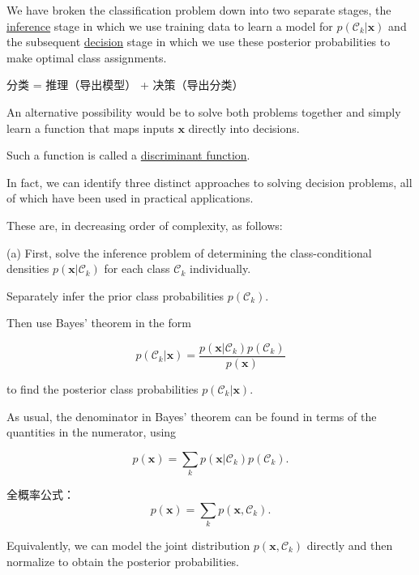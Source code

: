 \documentclass{article}
\begin{document}
We have broken the classification problem down into two separate stages, the \underline{\color{red}inference} stage in which we use training data to learn a model for $p(\mathcal{C}_{k}|\mathbf{x})$ and the subsequent \underline{\color{red}decision} stage in which we use these posterior probabilities to make optimal class assignments. 

{\color{red}
分类 = 推理（导出模型） + 决策（导出分类）
}

An alternative possibility would be to solve both problems together and simply learn a function that maps inputs $\mathbf{x}$ directly into decisions. 

Such a function is called a \underline{\color{red}discriminant function}.

In fact, we can identify three distinct approaches to solving decision problems, all of which have been used in practical applications. 

These are, in decreasing order of complexity, as follows:

(a) First, solve the inference problem of determining the class-conditional densities $p(\mathbf{x}|\mathcal{C}_{k})$ for each class $\mathcal{C}_{k}$ individually. 

Separately infer the prior class probabilities $p(\mathcal{C}_{k})$. 

Then use Bayes' theorem in the form

\begin{equation}
p(\mathcal{C}_{k}|\mathbf{x}) = \frac{p(\mathbf{x}|\mathcal{C}_{k})p(\mathcal{C}_{k})}{p(\mathbf{x})}
\tag{5.24}
\end{equation}

to find the posterior class probabilities $p(\mathcal{C}_{k}|\mathbf{x})$. 

As usual, the denominator in Bayes' theorem can be found in terms of the quantities in the numerator, using

\begin{equation}
p(\mathbf{x}) = \sum_{k}p(\mathbf{x}|\mathcal{C}_{k})p(\mathcal{C}_{k}).
\tag{5.25}
\end{equation}

{\color{red}
全概率公式：
\begin{equation*}
p(\mathbf{x}) = \sum_{k}p(\mathbf{x}, \mathcal{C}_{k}).
\end{equation*}
}

Equivalently, we can model the joint distribution $p(\mathbf{x},\mathcal{C}_{k})$ directly and then normalize to obtain the posterior probabilities. 
\end{document}
